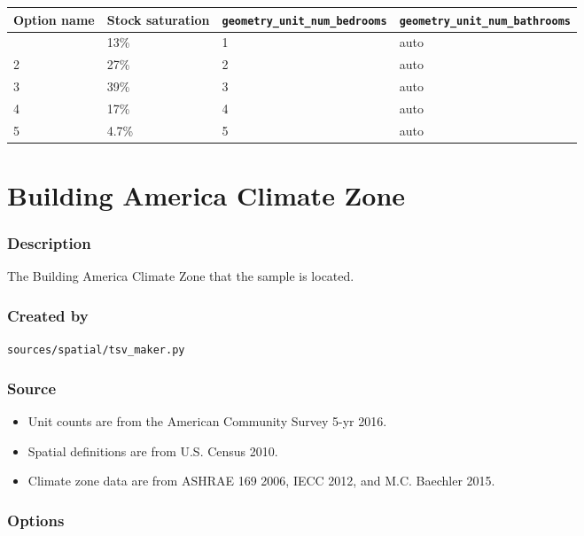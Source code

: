 \begin{longtable}[]{@{}llll@{}}
\toprule\noalign{}
Option name & Stock saturation & \texttt{geometry\_unit\_num\_bedrooms}
& \texttt{geometry\_unit\_num\_bathrooms} \\
\midrule\noalign{}
\endhead
\bottomrule\noalign{}
\endlastfoot
1 & 13\% & 1 & auto \\
2 & 27\% & 2 & auto \\
3 & 39\% & 3 & auto \\
4 & 17\% & 4 & auto \\
5 & 4.7\% & 5 & auto \\
\end{longtable}

\section{Building America Climate
Zone}\label{building_america_climate_zone}

\subsubsection{Description}\label{description-8}

The Building America Climate Zone that the sample is located.

\subsubsection{Created by}\label{created-by-8}

\texttt{sources/spatial/tsv\_maker.py}

\subsubsection{Source}\label{source-8}

\begin{itemize}
 
\item
  Unit counts are from the American Community Survey 5-yr 2016.
\item
  Spatial definitions are from U.S. Census 2010.
\item
  Climate zone data are from ASHRAE 169 2006, IECC 2012, and M.C.
  Baechler 2015.
\end{itemize}

\subsubsection{Options}\label{options-8}

